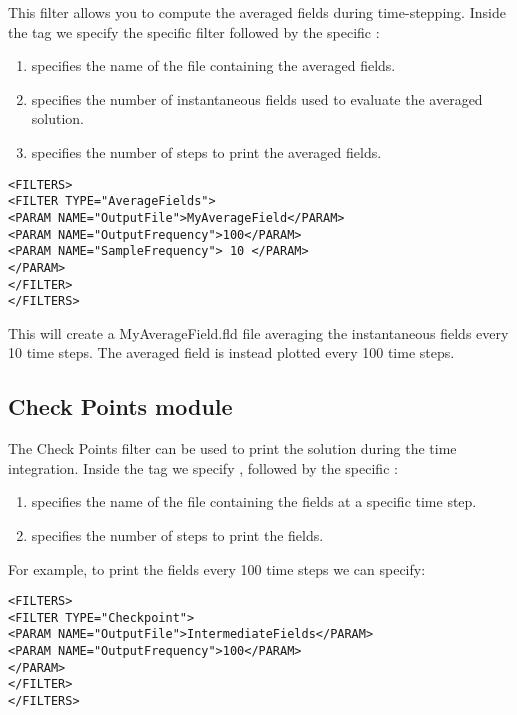 This filter allows you to compute the averaged fields during time-stepping. Inside the  tag we specify the specific filter  followed by the specific :

\begin{enumerate}
\item {} specifies the name of the file containing the averaged fields.
\item  {} specifies the number of instantaneous fields used to evaluate the averaged solution.
\item {} specifies the number of steps to print the averaged fields.
\end{enumerate}

\begin{lstlisting}[style=XMLStyle]
<FILTERS>
<FILTER TYPE="AverageFields">
<PARAM NAME="OutputFile">MyAverageField</PARAM>
<PARAM NAME="OutputFrequency">100</PARAM>
<PARAM NAME="SampleFrequency"> 10 </PARAM>		
</PARAM>
</FILTER>
</FILTERS>
\end{lstlisting}

This will create a MyAverageField.fld file averaging the instantaneous fields every 10 time steps. The averaged field is instead plotted every 100 time steps.

\subsection{Check Points module}
 
 The Check Points filter can be used to print the solution during the time integration.  Inside the  tag we specify , followed by the specific :

\begin{enumerate}
\item {} specifies the name of the file containing the fields at a specific time step.
\item {} specifies the number of steps to print the fields.
\end{enumerate}

For example, to print the fields every 100 time steps we can specify:

\begin{lstlisting}[style=XMLStyle]
<FILTERS>
<FILTER TYPE="Checkpoint">
<PARAM NAME="OutputFile">IntermediateFields</PARAM>
<PARAM NAME="OutputFrequency">100</PARAM>
</PARAM>
</FILTER>
</FILTERS>
\end{lstlisting}

